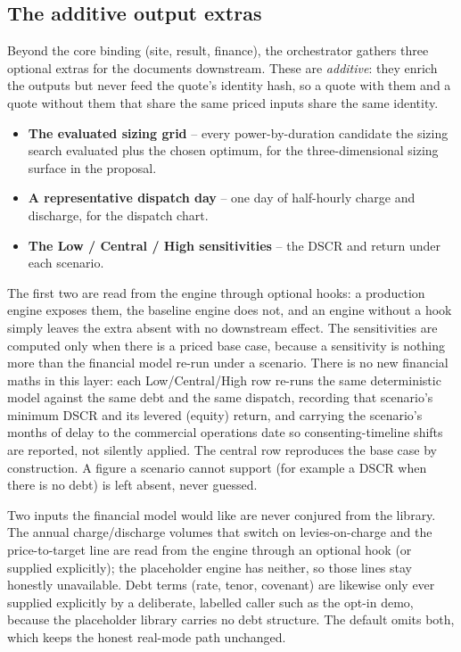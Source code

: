 \subsection{The additive output extras}

Beyond the core binding (site, result, finance), the orchestrator gathers three optional extras for the documents downstream. These are \emph{additive}: they enrich the outputs but never feed the quote's identity hash, so a quote with them and a quote without them that share the same priced inputs share the same identity.

\begin{itemize}
  \item \textbf{The evaluated sizing grid} -- every power-by-duration candidate the sizing search evaluated plus the chosen optimum, for the three-dimensional sizing surface in the proposal.
  \item \textbf{A representative dispatch day} -- one day of half-hourly charge and discharge, for the dispatch chart.
  \item \textbf{The Low / Central / High sensitivities} -- the DSCR and return under each scenario.
\end{itemize}

The first two are read from the engine through optional hooks: a production engine exposes them, the baseline engine does not, and an engine without a hook simply leaves the extra absent with no downstream effect. The sensitivities are computed only when there is a priced base case, because a sensitivity is nothing more than the financial model re-run under a scenario. There is no new financial maths in this layer: each Low/Central/High row re-runs the same deterministic model against the same debt and the same dispatch, recording that scenario's minimum DSCR and its levered (equity) return, and carrying the scenario's months of delay to the commercial operations date so consenting-timeline shifts are reported, not silently applied. The central row reproduces the base case by construction. A figure a scenario cannot support (for example a DSCR when there is no debt) is left absent, never guessed.

\begin{caution}
Two inputs the financial model would like are never conjured from the library. The annual charge/discharge volumes that switch on levies-on-charge and the price-to-target line are read from the engine through an optional hook (or supplied explicitly); the placeholder engine has neither, so those lines stay honestly unavailable. Debt terms (rate, tenor, covenant) are likewise only ever supplied explicitly by a deliberate, labelled caller such as the opt-in demo, because the placeholder library carries no debt structure. The default omits both, which keeps the honest real-mode path unchanged.
\end{caution}

